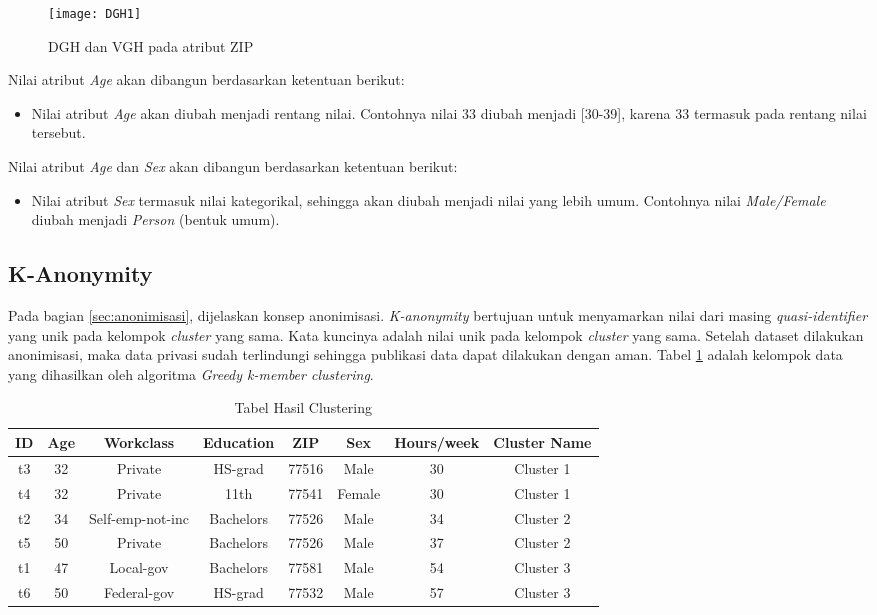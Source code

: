 \begin{figure}[H]
	\centering
	\texttt{[image: DGH1]}
	\caption{DGH dan VGH pada atribut ZIP}
	\label{fig:DGH1}
\end{figure}

\noindent Nilai atribut \textit{Age} akan dibangun berdasarkan ketentuan berikut: 

\begin{itemize}
\item Nilai atribut \textit{Age} akan diubah menjadi rentang nilai. Contohnya nilai 33  diubah menjadi [30-39], karena 33 termasuk pada rentang nilai tersebut.
\end{itemize}

\noindent Nilai atribut \textit{Age} dan \textit{Sex} akan dibangun berdasarkan ketentuan berikut: 

\begin{itemize}
\item Nilai atribut \textit{Sex} termasuk nilai kategorikal, sehingga akan diubah menjadi nilai yang lebih umum. Contohnya nilai \textit{Male/Female} diubah menjadi \textit{Person} (bentuk umum).
\end{itemize}


\newpage
\subsection{K-Anonymity}
Pada bagian \ref{sec:anonimisasi}, dijelaskan konsep anonimisasi. \textit{K-anonymity} bertujuan untuk menyamarkan nilai dari masing \textit{quasi-identifier} yang unik pada kelompok \textit{cluster} yang sama. Kata kuncinya adalah nilai unik pada kelompok \textit{cluster} yang sama. Setelah dataset dilakukan anonimisasi, maka data privasi sudah terlindungi sehingga publikasi data dapat dilakukan dengan aman. Tabel \ref{table:clustering} adalah kelompok data yang dihasilkan oleh algoritma \textit{Greedy k-member clustering}. 
\begin{table}[H]
\centering
\caption{Tabel Hasil Clustering}
\begin{tabular}{c c c c c c c c}
\hline 
ID & Age & Workclass & Education & ZIP & Sex & Hours/week & Cluster Name\\ 
\hline 
t3 & 32 & Private & HS-grad & 77516 & Male & 30 & Cluster 1 \\ 
t4 & 32 & Private & 11th & 77541 & Female & 30 & Cluster 1 \\ 
\hline 
t2 & 34 & Self-emp-not-inc & Bachelors & 77526 & Male & 34 & Cluster 2 \\ 
t5 & 50 & Private & Bachelors & 77526 & Male & 37	& Cluster 2\\ 
\hline 
t1 & 47 & Local-gov & Bachelors & 77581 & Male & 54 & Cluster 3\\ 
t6 & 50 & Federal-gov & HS-grad & 77532 & Male & 57 & Cluster 3\\ 
\hline 
\end{tabular} 
\label{table:clustering}
\end{table}
\vspace{0.4cm}

